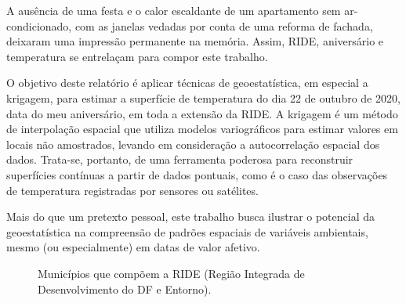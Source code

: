 \documentclass[
  letterpaper,
  DIV=11,
  numbers=noendperiod]{scrartcl}
\begin{document}
A ausência de uma festa e o calor escaldante de um apartamento sem
ar-condicionado, com as janelas vedadas por conta de uma reforma de
fachada, deixaram uma impressão permanente na memória. Assim, RIDE,
aniversário e temperatura se entrelaçam para compor este trabalho.

O objetivo deste relatório é aplicar técnicas de geoestatística, em
especial a krigagem, para estimar a superfície de temperatura do dia 22
de outubro de 2020, data do meu aniversário, em toda a extensão da RIDE.
A krigagem é um método de interpolação espacial que utiliza modelos
variográficos para estimar valores em locais não amostrados, levando em
consideração a autocorrelação espacial dos dados. Trata-se, portanto, de
uma ferramenta poderosa para reconstruir superfícies contínuas a partir
de dados pontuais, como é o caso das observações de temperatura
registradas por sensores ou satélites.

Mais do que um pretexto pessoal, este trabalho busca ilustrar o
potencial da geoestatística na compreensão de padrões espaciais de
variáveis ambientais, mesmo (ou especialmente) em datas de valor
afetivo.

\label{cell-fig-mapa-ride}
\begin{figure}[H]


\caption{\label{fig-mapa-ride}Municípios que compõem a RIDE (Região
Integrada de Desenvolvimento do DF e Entorno).}

\end{figure}%
\end{document}
